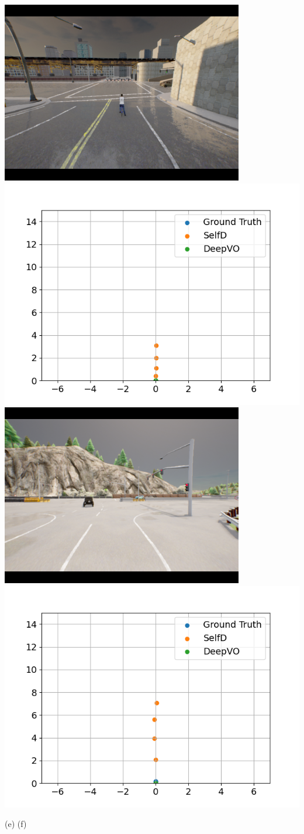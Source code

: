 \documentclass[letterpaper, 12pt]{book}
\theoremstyle{definition}
\theoremstyle{definition}
\theoremstyle{definition}
\theoremstyle{definition}
\theoremstyle{definition}
\begin{document}
{\begin{minipage}{\textwidth}
\begin{center}
\includegraphics[trim={1.5cm 0.75cm 1.5cm 0.75cm},clip,height=0.19\textwidth]{./img/compare/12.png}
\includegraphics[trim={1cm 0.5cm 1.5cm 1cm},clip,height=0.19\textwidth]{./img/compare/12_wp.png}
\hfill
\includegraphics[trim={1.5cm 0.75cm 1.5cm 0.75cm},clip,height=0.19\textwidth]{./img/compare/11.png}
\includegraphics[trim={1cm 0.5cm 1.5cm 1cm},clip,height=0.19\textwidth]{./img/compare/11_wp.png}

\hspace{0.19\textwidth} (e) \hfill (f) \hspace{0.19\textwidth}
\vspace{5pt}


\end{center}
\end{minipage}}
\end{document}
